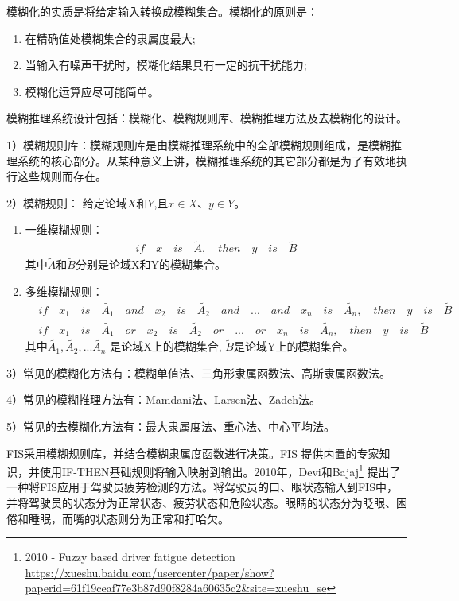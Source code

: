 模糊化的实质是将给定输入转换成模糊集合。模糊化的原则是：
\begin{enumerate}[label=\circled{\arabic*}]
    \item 在精确值处模糊集合的隶属度最大;
    \item 当输入有噪声干扰时，模糊化结果具有一定的抗干扰能力;
    \item 模糊化运算应尽可能简单。
\end{enumerate}

模糊推理系统设计包括：模糊化、模糊规则库、模糊推理方法及去模糊化的设计。

1）模糊规则库：模糊规则库是由模糊推理系统中的全部模糊规则组成，是模糊推理系统的核心部分。从某种意义上讲，模糊推理系统的其它部分都是为了有效地执行这些规则而存在。

2）模糊规则：
给定论域$X$和$Y$,且$x \in X$、$y \in Y$。
\begin{enumerate}[label=\circled{\arabic*}]
    \item 一维模糊规则：
        \begin{eqnarray}
            if \quad x \quad is \quad \tilde{A},\quad then \quad y \quad is \quad \tilde{B} \nonumber
        \end{eqnarray}
        其中$\tilde{A}$和$\tilde{B}$分别是论域X和Y的模糊集合。

    \item 多维模糊规则：
        \begin{align}
            & if \quad x_1 \quad is \quad \tilde{A_1} \quad and \quad x_2 \quad is \quad \tilde{A_2} \quad and \quad ... \quad and \quad x_n \quad is \quad \tilde{A_n},\quad then \quad y \quad is \quad \tilde{B} \nonumber \\
            & if \quad x_1 \quad is \quad \tilde{A_1} \quad or \quad x_2 \quad is \quad \tilde{A_2} \quad or \quad ... \quad or \quad x_n \quad is \quad \tilde{A_n},\quad then \quad y \quad is \quad \tilde{B} \nonumber
        \end{align}
        其中$\tilde{A_1},\tilde{A_2},...\tilde{A_n}$ 是论域X上的模糊集合, $\tilde{B}$是论域Y上的模糊集合。
\end{enumerate}

3）常见的模糊化方法有：模糊单值法、三角形隶属函数法、高斯隶属函数法。

4）常见的模糊推理方法有：Mamdani法、Larsen法、Zadeh法。

5）常见的去模糊化方法有：最大隶属度法、重心法、中心平均法。

FIS采用模糊规则库，并结合模糊隶属度函数进行决策。FIS 提供内置的专家知识，并使用IF-THEN基础规则将输入映射到输出。2010年，Devi和Bajaj\footnote{2010 - Fuzzy based driver fatigue detection \quad \url{https://xueshu.baidu.com/usercenter/paper/show?paperid=61f19ceaf77e3b87d90f8284a60635c2&site=xueshu_se}} 提出了一种将FIS应用于驾驶员疲劳检测的方法。将驾驶员的口、眼状态输入到FIS中，并将驾驶员的状态分为正常状态、疲劳状态和危险状态。眼睛的状态分为眨眼、困倦和睡眠，而嘴的状态则分为正常和打哈欠。

